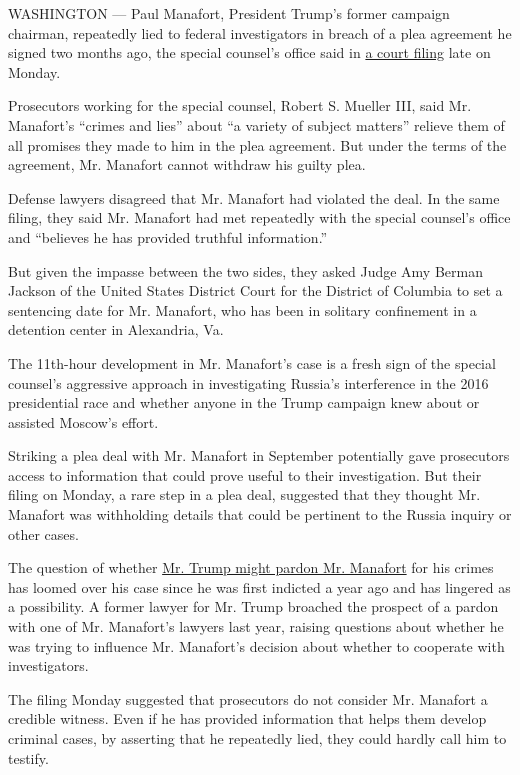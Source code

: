 WASHINGTON --- Paul Manafort, President Trump's former campaign
chairman, repeatedly lied to federal investigators in breach of a plea
agreement he signed two months ago, the special counsel's office said in
\href{https://int.nyt.com/data/documenthelper/491-paul-manafort-plea-agreement-breach/49c0d15e0a829872d8c9/optimized/full.pdf\#page=1}{a
court filing} late on Monday.

Prosecutors working for the special counsel, Robert S. Mueller III, said
Mr. Manafort's ``crimes and lies'' about ``a variety of subject
matters'' relieve them of all promises they made to him in the plea
agreement. But under the terms of the agreement, Mr. Manafort cannot
withdraw his guilty plea.

Defense lawyers disagreed that Mr. Manafort had violated the deal. In
the same filing, they said Mr. Manafort had met repeatedly with the
special counsel's office and ``believes he has provided truthful
information.''

But given the impasse between the two sides, they asked Judge Amy Berman
Jackson of the United States District Court for the District of Columbia
to set a sentencing date for Mr. Manafort, who has been in solitary
confinement in a detention center in Alexandria, Va.

The 11th-hour development in Mr. Manafort's case is a fresh sign of the
special counsel's aggressive approach in investigating Russia's
interference in the 2016 presidential race and whether anyone in the
Trump campaign knew about or assisted Moscow's effort.

Striking a plea deal with Mr. Manafort in September potentially gave
prosecutors access to information that could prove useful to their
investigation. But their filing on Monday, a rare step in a plea deal,
suggested that they thought Mr. Manafort was withholding details that
could be pertinent to the Russia inquiry or other cases.

The question of whether
\href{https://www.nytimes.com/2018/03/28/us/politics/trump-pardon-michael-flynn-paul-manafort-john-dowd.html}{Mr.
Trump might pardon Mr. Manafort} for his crimes has loomed over his case
since he was first indicted a year ago and has lingered as a
possibility. A former lawyer for Mr. Trump broached the prospect of a
pardon with one of Mr. Manafort's lawyers last year, raising questions
about whether he was trying to influence Mr. Manafort's decision about
whether to cooperate with investigators.

The filing Monday suggested that prosecutors do not consider Mr.
Manafort a credible witness. Even if he has provided information that
helps them develop criminal cases, by asserting that he repeatedly lied,
they could hardly call him to testify.

